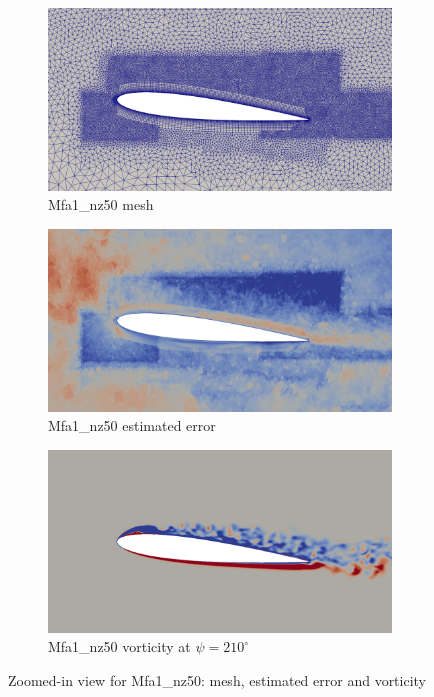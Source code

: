 \begin{figure}[H]
	\centering
	\begin{subfigure}[b]{0.7\textwidth}
		\centering
		\includegraphics[width=1\textwidth]{figures/adapt_strat/zoomed/Mfa1_mesh.png}
		\caption{Mfa1\_nz50 mesh}
		\label{fig:Mfa1_mesh_zoomed}
	\end{subfigure}
	\begin{subfigure}[b]{0.7\textwidth}
		\centering
		\includegraphics[width=1\textwidth]{figures/adapt_strat/zoomed/Mfa1_error.png}
		\caption{Mfa1\_nz50 estimated error}
		\label{fig:Mfa1_max_error_zoomed}
	\end{subfigure}
	\begin{subfigure}[b]{0.7\textwidth}
		\centering
		\includegraphics[width=1\textwidth]{figures/adapt_strat/zoomed/Mfa1_ph_210.png}
		\caption{Mfa1\_nz50 vorticity at $\psi=210^\circ$}
		\label{fig:Mfa1_vorticity_zoomed}
	\end{subfigure}
	\caption{Zoomed-in view for Mfa1\_nz50: mesh, estimated error and vorticity}
	\label{fig:Mfa1_zoomed}
\end{figure}


